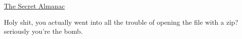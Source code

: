 \documentclass[a4paper]{article}
\begin{document}
\begin{center}
\Large{\underline{The Secret Almanac}}
\end{center}

\newenvironment{noSepEnumerate}
{ \begin{enumerate}
    \setlength{\itemsep}{1pt}
    \setlength{\parskip}{0pt}
    \setlength{\parsep}{0pt}}
{ \end{enumerate}}
Holy shit, you actually went into all the trouble of opening the file with a zip? seriously you're the bomb.
\end{document}
